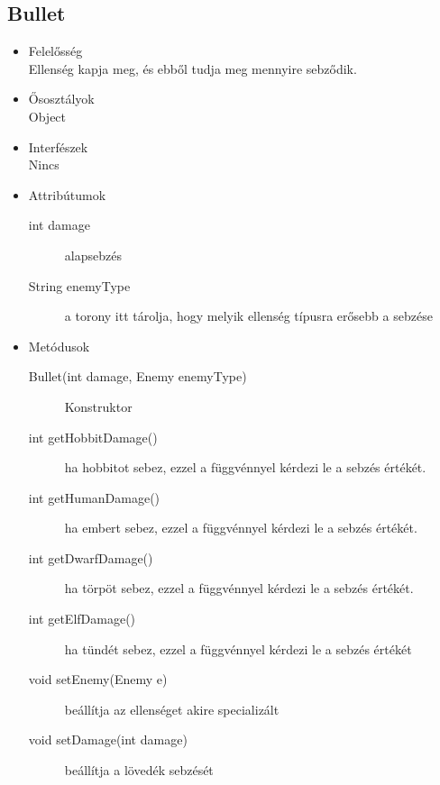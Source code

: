 \subsection{Bullet}
\begin{itemize}
\item Felelősség\\
Ellenség kapja meg, és ebből tudja meg mennyire sebződik.
\item Ősosztályok\\
Object
\item Interfészek\\
Nincs
\item Attribútumok\\
	\begin{description}
		\item[int damage] alapsebzés
		\item[String enemyType] a torony itt tárolja, hogy melyik ellenség típusra erősebb a sebzése
	\end{description}
\item Metódusok\\
	\begin{description}
		\item[Bullet(int damage, Enemy enemyType)] Konstruktor
\item[int getHobbitDamage()] ha hobbitot sebez, ezzel a függvénnyel kérdezi le a sebzés értékét. 
\item[int getHumanDamage()] ha embert sebez, ezzel a függvénnyel kérdezi le a sebzés értékét.
\item[int getDwarfDamage()] ha törpöt sebez, ezzel a függvénnyel kérdezi le a sebzés értékét.
\item[int getElfDamage()] ha tündét sebez, ezzel a függvénnyel kérdezi le a sebzés értékét
\item[void setEnemy(Enemy e)] beállítja az ellenséget akire specializált
\item[void setDamage(int damage)] beállítja a lövedék sebzését

	\end{description}
\end{itemize}



